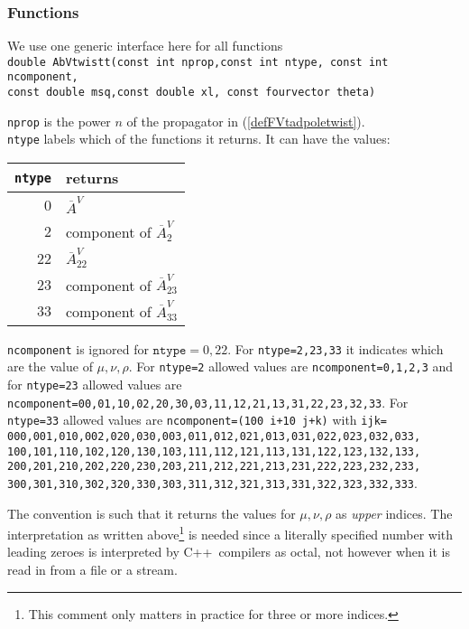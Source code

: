 \documentclass[12pt,a4paper]{article}
\newcommand{\mytt}[1]{\texttt{#1}}
\newcommand{\newfunction}[1]{\mytt{#1}\index{\mytt{#1}}}
\newcommand{\cpp}{\textsc{C++}}
\begin{document}
\subsubsection{Functions}

We use one generic interface here for all functions\\
\mytt{double \newfunction{AbVtwistt}(const int nprop,const int ntype,
const int ncomponent,\\
\hspace*{2cm}		 const double msq,const double xl,
		 const fourvector theta)}

\mytt{nprop} is the power $n$ of the propagator in (\ref{defFVtadpoletwist}).\\
\mytt{ntype} labels which of the functions it returns.
It can have the values:\\
\begin{center}
\begin{tabular}{|rl|}
\hline
\mytt{ntype} & returns \\
\hline
0 & $\overline A^V$ \\
2 & component of $\overline A^V_2$ \\
22 & $\overline A^V_{22}$ \\
23 & component of $\overline A^V_{23}$ \\
33 & component of $\overline A^V_{33}$ \\
\hline
\end{tabular}
\end{center}
\mytt{ncomponent} is ignored for $\mytt{ntype}=0,22$. For
\mytt{ntype=2,23,33} it indicates which are the value of $\mu,\nu,\rho$.
For \mytt{ntype=2} allowed values are \mytt{ncomponent=0,1,2,3}
and for  \mytt{ntype=23} allowed values are
\mytt{ncomponent=00,01,10,02,20,30,03,11,12,21,13,31,22,23,32,33}.
For \mytt{ntype=33} allowed values are
\mytt{ncomponent=(100\,i+10\,j+k)} with \mytt{ijk=}\\
\mytt{000,001,010,002,020,030,003,011,012,021,013,031,022,023,032,033,}\\
\mytt{100,101,110,102,120,130,103,111,112,121,113,131,122,123,132,133,}\\
\mytt{200,201,210,202,220,230,203,211,212,221,213,231,222,223,232,233,}\\
\mytt{300,301,310,302,320,330,303,311,312,321,313,331,322,323,332,333}.

The convention is such that it returns the values for $\mu,\nu,\rho$
as \emph{upper} indices. The interpretation as written above\footnote{This
comment only matters in practice for three or more indices.} is needed
since a literally specified number with leading zeroes is
interpreted by \cpp\ compilers as octal, not however when it is read in from
a file or a stream.\\
\end{document}
